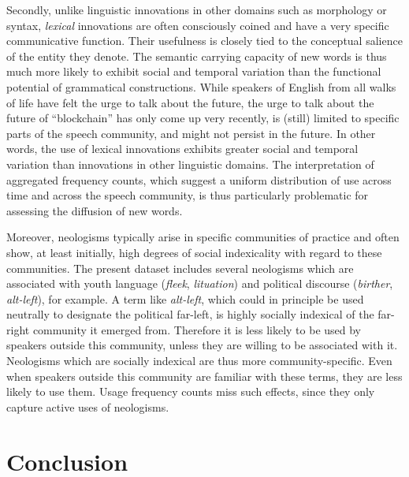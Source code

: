 \documentclass[
  a4paper,
  abstract=on,
  captions=tableabove,
  ]{scrartcl}
\newcommand{\ol}[1]{\emph{#1}}
\begin{document}
    Secondly, unlike linguistic innovations in other domains such as morphology or syntax, \emph{lexical} innovations are often consciously coined and have a very specific communicative function. Their usefulness is closely tied to the conceptual salience of the entity they denote. The semantic carrying capacity of new words is thus much more likely to exhibit social and temporal variation than the functional potential of grammatical constructions. While speakers of English from all walks of life have felt the urge to talk about the future, the urge to talk about the future of \enquote{blockchain} has only come up very recently, is (still) limited to specific parts of the speech community, and might not persist in the future. In other words, the use of lexical innovations exhibits greater social and temporal variation than innovations in other linguistic domains. The interpretation of aggregated frequency counts, which suggest a uniform distribution of use across time and across the speech community, is thus particularly problematic for assessing the diffusion of new words.

    Moreover, neologisms typically arise in specific communities of practice and often show, at least initially, high degrees of social indexicality with regard to these communities. The present dataset includes several neologisms which are associated with youth language (\ol{fleek}, \ol{lituation}) and political discourse (\ol{birther}, \ol{alt-left}), for example. A term like \ol{alt-left}, which could in principle be used neutrally to designate the political far-left, is highly socially indexical of the far-right community it emerged from. Therefore it is less likely to be used by speakers outside this community, unless they are willing to be associated with it. Neologisms which are socially indexical are thus more community-specific. Even when speakers outside this community are familiar with these terms, they are less likely to use them. Usage frequency counts miss such effects, since they only capture active uses of neologisms.


\section{Conclusion}
  \label{sec:conclusion}
\end{document}
